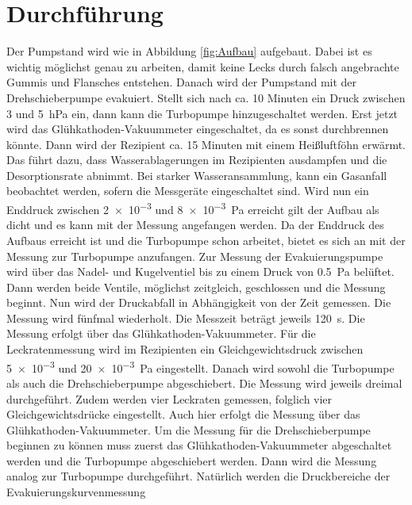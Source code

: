 \section{Durchführung}
\label{sec:Durchführung}
Der Pumpstand wird wie in Abbildung \ref{fig:Aufbau} aufgebaut. Dabei ist es wichtig möglichst genau 
zu arbeiten, damit keine Lecks durch falsch angebrachte Gummis und Flansches entstehen. Danach wird 
der Pumpstand mit der Drehschieberpumpe evakuiert. Stellt sich nach ca. 10 Minuten ein Druck 
zwischen 3 und \SI{5}{\hecto\pascal} ein, dann kann die Turbopumpe hinzugeschaltet werden. 
Erst jetzt wird das Glühkathoden-Vakuummeter eingeschaltet, da es sonst durchbrennen könnte.
Dann wird der Rezipient ca. 15 Minuten mit einem Heißluftföhn erwärmt. Das 
führt dazu, dass Wasserablagerungen im Rezipienten ausdampfen und die Desorptionsrate 
abnimmt. Bei starker Wasseransammlung, kann ein Gasanfall beobachtet werden, sofern die 
Messgeräte eingeschaltet sind. Wird nun ein Enddruck zwischen \SI{2e-3}{} und \SI{8e-3}{\pascal} 
erreicht gilt der Aufbau als dicht und es kann mit der Messung angefangen werden.
\newline
\newline
Da der Enddruck des Aufbaus erreicht ist und die Turbopumpe schon arbeitet, bietet es sich an 
mit der Messung zur Turbopumpe anzufangen. Zur Messung der Evakuierungspumpe wird über das 
Nadel- und Kugelventiel bis zu einem Druck von \SI{0.5}{\pascal} belüftet. Dann werden beide 
Ventile, möglichst zeitgleich, geschlossen und die Messung beginnt. Nun wird der Druckabfall in 
Abhängigkeit von der Zeit gemessen. Die Messung wird fünfmal wiederholt. Die Messzeit beträgt 
jeweils \SI{120}{\second}. Die Messung erfolgt über das Glühkathoden-Vakuummeter.
\newline 
\newline 
Für die Leckratenmessung wird im Rezipienten ein Gleichgewichtsdruck zwischen \SI{5e-3}{} 
und \SI{20e-3}{\pascal} eingestellt. Danach wird sowohl die Turbopumpe als auch die 
Drehschieberpumpe abgeschiebert. Die Messung wird jeweils dreimal durchgeführt. Zudem werden 
vier Leckraten gemessen, folglich vier Gleichgewichtsdrücke eingestellt. Auch hier erfolgt die 
Messung über das Glühkathoden-Vakuummeter. 
\newline
\newline
Um die Messung für die Drehschieberpumpe beginnen zu können muss zuerst das Glühkathoden-Vakuummeter 
abgeschaltet werden und die Turbopumpe abgeschiebert werden. Dann wird die Messung analog 
zur Turbopumpe durchgeführt. Natürlich werden die Druckbereiche der Evakuierungskurvenmessung 
